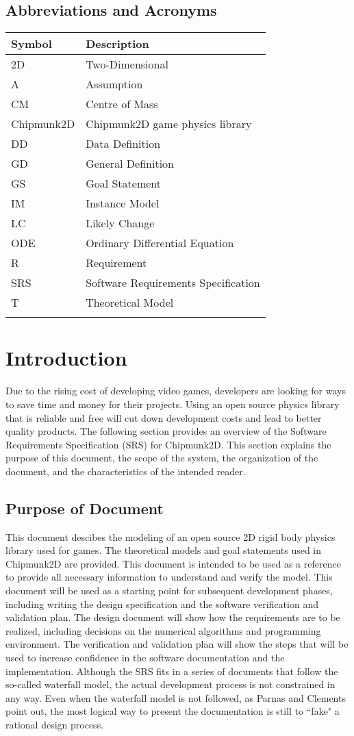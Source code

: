 \documentclass[12pt]{article}
\begin{document}
\subsection{Abbreviations and Acronyms}
\label{Sec:TAbbAcc}
\begin{longtable*}{l l}
\toprule
Symbol & Description
\\
\midrule
2D & Two-Dimensional
\\
A & Assumption
\\
CM & Centre of Mass
\\
Chipmunk2D & Chipmunk2D game physics library
\\
DD & Data Definition
\\
GD & General Definition
\\
GS & Goal Statement
\\
IM & Instance Model
\\
LC & Likely Change
\\
ODE & Ordinary Differential Equation
\\
R & Requirement
\\
SRS & Software Requirements Specification
\\
T & Theoretical Model
\\
\bottomrule
\label{Table:TAbbAcc}
\end{longtable*}
\section{Introduction}
\label{Sec:Intro}
Due to the rising cost of developing video games, developers are looking for ways to save time and money for their projects. Using an open source physics library that is reliable and free will cut down development costs and lead to better quality products.
The following section provides an overview of the Software Requirements Specification (SRS) for Chipmunk2D. This section explains the purpose of this document, the scope of the system, the organization of the document, and the characteristics of the intended reader.
\subsection{Purpose of Document}
\label{Sec:DocPurpose}
This document descibes the modeling of an open source 2D rigid body physics library used for games. The theoretical models and goal statements used in Chipmunk2D are provided. This document is intended to be used as a reference to provide all necessary information to understand and verify the model.
This document will be used as a starting point for subsequent development phases, including writing the design specification and the software verification and validation plan. The design document will show how the requirements are to be realized, including decisions on the numerical algorithms and programming environment. The verification and validation plan will show the steps that will be used to increase confidence in the software documentation and the implementation. Although the SRS fits in a series of documents that follow the so-called waterfall model, the actual development process is not constrained in any way. Even when the waterfall model is not followed, as Parnas and Clements point out, the most logical way to present the documentation is still to ``fake" a rational design process.
\end{document}
